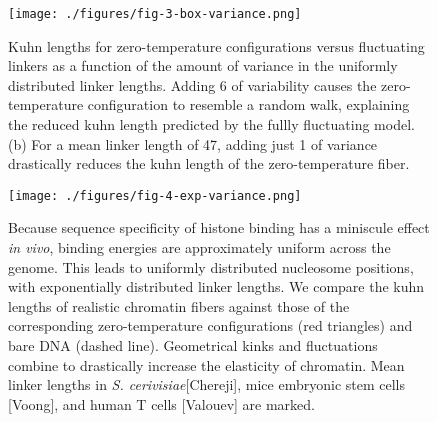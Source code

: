 \documentclass[%
 reprint,
superscriptaddress,
showpacs,preprintnumbers,
 amsmath,amssymb,
 aps,
 prl,
]{revtex4-1}
\begin{document}
\begin{figure}[t]
    \centering
    \texttt{[image: ./figures/fig-3-box-variance.png]}
    \caption{Kuhn lengths for zero-temperature configurations versus
    fluctuating linkers as a function of the amount of variance in the uniformly
    distributed linker lengths.  Adding \SI{6}{\basepair} of variability causes the zero-temperature
    configuration to resemble a random walk, explaining the reduced kuhn
    length predicted by the fullly fluctuating model. (b) For a mean linker
    length of \SI{47}{\basepair}, adding just \SI{1}{\basepair} of variance
    drastically reduces the kuhn length of the zero-temperature fiber.}
\end{figure}



\begin{figure}[t]
    \centering
    \texttt{[image: ./figures/fig-4-exp-variance.png]}
    \caption{Because sequence specificity of histone binding has a miniscule effect
    \textit{in vivo}, binding energies are approximately uniform across the
    genome. This leads to uniformly distributed nucleosome positions, with exponentially distributed linker lengths. We compare
    the kuhn lengths of realistic chromatin fibers against those of the
    corresponding zero-temperature configurations (red
    triangles) and bare
    DNA (dashed line). Geometrical kinks and fluctuations combine to drastically
    increase the elasticity of chromatin. Mean linker lengths in \textit{S.
    cerivisiae}[Chereji], mice embryonic stem cells [Voong], and human T cells
    [Valouev] are marked.}
\end{figure}
\end{document}
